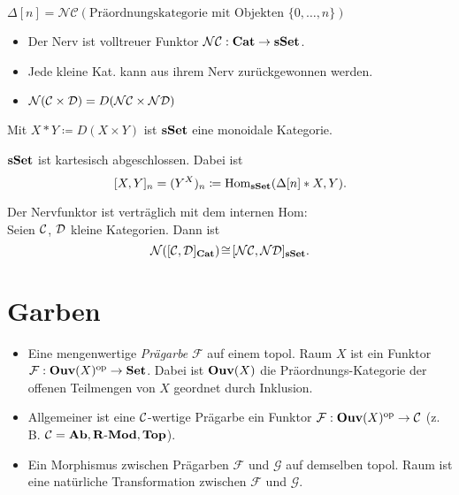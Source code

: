 \documentclass{cheat-sheet}
\newcommand{\Fais}{\mathcal{F}} %
\newcommand{\Garb}{\mathcal{G}} %
\newcommand{\NCat}{\mathcal{NC}} %
\newcommand{\Nerve}{\mathcal{N}} %
\begin{document}
\begin{bsp}
 $\Delta[n] = \NCat(\text{Präordnungskategorie mit Objekten } \{ 0, \ldots, n \})$
\end{bsp}

\begin{bem}
  \begin{itemize}
    \item Der Nerv ist volltreuer Funktor $\NCat : \CatC \to \sSet$.
    \item Jede kleine Kat. kann aus ihrem Nerv zurückgewonnen werden.
    \item $\Nerve(\Cat \times \Dat) = D(\Nerve\Cat \times \Nerve\Dat)$
  \end{itemize}
\end{bem}

\begin{bem}
  Mit $X \!*\! Y \coloneqq D(X \!\times\! Y)$ ist $\mathbf{sSet}$ eine monoidale Kategorie.
\end{bem}

\begin{prop}
  $\mathbf{sSet}$ ist kartesisch abgeschlossen. Dabei ist
  \[ [X, Y]_n = (Y^X)_n \coloneqq \operatorname{Hom}_{\mathbf{sSet}}(\Delta[n] * X, Y). \]
\end{prop}

\begin{prop}
  Der Nervfunktor ist verträglich mit dem internen Hom: \\
  Seien $\mathcal{C}$, $\mathcal{D}$ kleine Kategorien. Dann ist
  \[ \Nerve([\Cat, \Dat]_{\CatC}) \!\cong\! [\Nerve\Cat, \Nerve\Dat]_{\sSet}. \]
\end{prop}

\section{Garben}



\begin{defn}
  \begin{itemize}
    \item Eine mengenwertige \emph{Prägarbe} $\Fais$ auf einem topol. Raum $X$ ist ein Funktor
    $\Fais : \Ouv(X)^\op \to \SetC$.
    Dabei ist $\mathbf{Ouv}(X)$ die Präordnungs-Kategorie der offenen Teilmengen von $X$ geordnet durch Inklusion.
    \item Allgemeiner ist eine $\mathcal{C}$-wertige Prägarbe ein Funktor $\Fais : \Ouv(X)^\op \to \Cat$ (z.\,B. $\mathcal{C} = \mathbf{Ab}, \mathbf{R\text{-}Mod}, \mathbf{Top}$).
    \item Ein Morphismus zwischen Prägarben $\Fais$ und $\Garb$ auf demselben topol. Raum ist eine natürliche Transformation zwischen $\Fais$ und $\Garb$.
  \end{itemize}
\end{defn}
\end{document}
